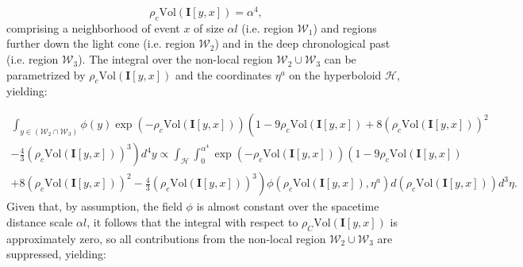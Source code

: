 \documentclass{article}
\begin{document}
\begin{equation}
\rho_c \mathrm{Vol} \left( \mathbf{I} \left[ y, x \right] \right) = \alpha^4,
\end{equation}
comprising a neighborhood of event $x$ of size ${\alpha l}$ (i.e. region ${\mathcal{W}_1}$) and regions further down the light cone (i.e. region ${\mathcal{W}_2}$) and in the deep chronological past (i.e. region ${\mathcal{W}_3}$). The integral over the non-local region ${\mathcal{W}_2 \cup \mathcal{W}_3}$ can be parametrized by ${\rho_c \mathrm{Vol} \left( \mathbf{I} \left[ y, x \right] \right)}$ and the coordinates ${\eta^a}$ on the hyperboloid ${\mathcal{H}}$, yielding:

\begin{multline}
\int_{y \in \left( \mathcal{W}_2 \cap \mathcal{W}_3 \right)} \phi \left( y \right) \exp \left( - \rho_c \mathrm{Vol} \left( \mathbf{I} \left[ y, x \right] \right) \right) \left( 1 - 9 \rho_c \mathrm{Vol} \left( \mathbf{I} \left[ y, x \right] \right) + 8 \left( \rho_c \mathrm{Vol} \left( \mathbf{I} \left[ y, x \right] \right) \right)^2 \right.\\
\left. - \frac{4}{3} \left( \rho_c \mathrm{Vol} \left( \mathbf{I} \left[ y, x \right] \right) \right)^3 \right) d^4 y \propto \int_{\mathcal{H}} \int_{0}^{\alpha^4} \exp \left( - \rho_c \mathrm{Vol} \left( \mathbf{I} \left[ y, x \right] \right) \right) \left( 1 - 9 \rho_c \mathrm{Vol} \left( \mathbf{I} \left[ y, x \right] \right) \right.\\
\left. + 8 \left( \rho_c \mathrm{Vol} \left( \mathbf{I} \left[ y, x \right] \right) \right)^2 - \frac{4}{3} \left( \rho_c \mathrm{Vol} \left( \mathbf{I} \left[ y, x \right] \right) \right)^3 \right) \phi \left( \rho_c \mathrm{Vol} \left( \mathbf{I} \left[ y, x \right] \right), \eta^a \right) d \left( \rho_c \mathrm{Vol} \left( \mathbf{I} \left[ y, x \right] \right) \right) d^3 \eta.
\end{multline}
Given that, by assumption, the field ${\phi}$ is almost constant over the spacetime distance scale ${\alpha l}$, it follows that the integral with respect to ${\rho_C \mathrm{Vol} \left( \mathbf{I} \left[ y, x \right] \right)}$ is approximately zero, so all contributions from the non-local region ${\mathcal{W}_2 \cup \mathcal{W}_3}$ are suppressed, yielding:
\end{document}
